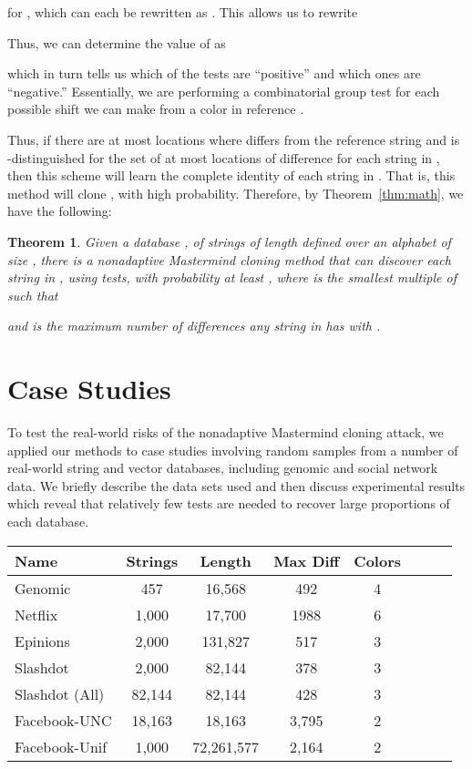 \documentclass{article}
\newtheorem{theorem}{Theorem}
\begin{document}
for ,
which can each be rewritten as
.
This allows us to rewrite

Thus, we can determine the value of  as

which in turn tells us which of the  tests are ``positive'' and
which ones are ``negative.''
Essentially, we are performing a combinatorial group test for each possible
shift we can make from a color in reference .

Thus, if there are at most  locations where  differs from the
reference string and  is -distinguished for the set of at most 
locations of difference for each string in , then this scheme will learn
the complete identity of each string in .
That is, this method will clone , with high probability.
Therefore, by Theorem~\ref{thm:math}, we have the following:

\begin{theorem}
Given a database
,
of strings of length  defined over an alphabet of size ,
there is a nonadaptive Mastermind cloning method that can discover each
string in ,
using  tests, with probability at least , where
 is the smallest multiple of  such that 

and  is
the maximum number of differences any string in  has with .
\label{thm:sparse}
\end{theorem}



\section{Case Studies}
\label{sec:experiments}

To test the real-world risks of the nonadaptive Mastermind cloning attack, we applied 
our methods to case studies involving random samples from
a number of real-world string and vector databases,
including genomic and social network data.  
We briefly describe the data sets 
used and then discuss experimental results which reveal that relatively few 
tests are needed to recover large proportions of each database. 

\begin{table}[hbt!]
\centering
\begin{tabular}{|l|c|c|c|c|c|c|c|}
\multicolumn{1}{l}{ Name}  
&\multicolumn{1}{c}{Strings} 
&\multicolumn{1}{c}{Length}
&\multicolumn{1}{c}{Max Diff}
&\multicolumn{1}{c}{Colors}  \\
\hline
Genomic & 457 & 16,568 & 492 & 4 \\
Netflix & 1,000 & 17,700 & 1988 & 6 \\
Epinions & 2,000 & 131,827 & 517& 3\\
Slashdot & 2,000 & 82,144 & 378 & 3\\
Slashdot (All) & 82,144 & 82,144 & 428 & 3\\
Facebook-UNC & 18,163 & 18,163 & 3,795 & 2\\
Facebook-Unif & 1,000 & 72,261,577 & 2,164 & 2\\
\hline
\end{tabular}
\end{table}
\end{document}
